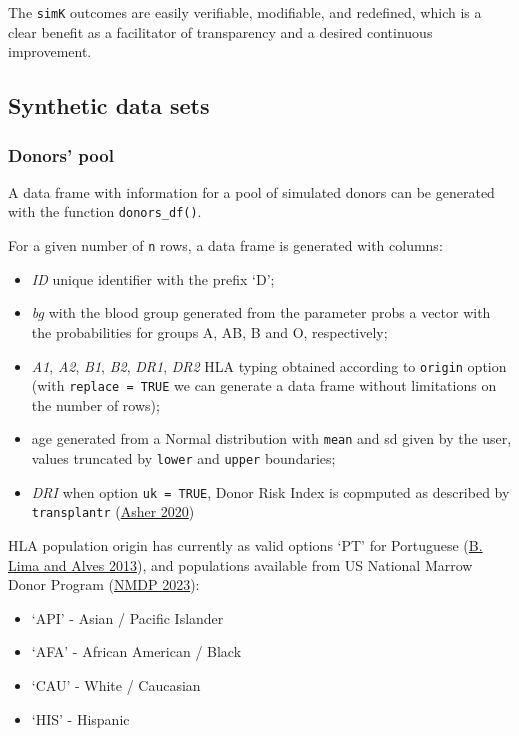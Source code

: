 \documentclass[
]{article}
\providecommand{\tightlist}{%
  \setlength{\itemsep}{0pt}\setlength{\parskip}{0pt}}
\begin{document}
The \texttt{simK} outcomes are easily verifiable, modifiable, and
redefined, which is a clear benefit as a facilitator of transparency and
a desired continuous improvement.

\hypertarget{synthetic-data-sets}{%
\subsection{Synthetic data sets}\label{synthetic-data-sets}}

\hypertarget{donors-pool}{%
\subsubsection{Donors' pool}\label{donors-pool}}

A data frame with information for a pool of simulated donors can be
generated with the function \texttt{donors\_df()}.

For a given number of \texttt{n} rows, a data frame is generated with
columns:

\begin{itemize}
\tightlist
\item
  \emph{ID} unique identifier with the prefix `D';
\item
  \emph{bg} with the blood group generated from the parameter probs a
  vector with the probabilities for groups A, AB, B and O, respectively;
\item
  \emph{A1}, \emph{A2}, \emph{B1}, \emph{B2}, \emph{DR1}, \emph{DR2} HLA
  typing obtained according to \texttt{origin} option (with
  \texttt{replace\ =\ TRUE} we can generate a data frame without
  limitations on the number of rows);
\item
  age generated from a Normal distribution with \texttt{mean} and sd
  given by the user, values truncated by \texttt{lower} and
  \texttt{upper} boundaries;
\item
  \emph{DRI} when option \texttt{uk\ =\ TRUE}, Donor Risk Index is
  copmputed as described by \texttt{transplantr}
  (\protect\hyperlink{ref-transplantr}{Asher 2020})
\end{itemize}

HLA population origin has currently as valid options `PT' for Portuguese
(\protect\hyperlink{ref-Lima:2013a}{B. Lima and Alves 2013}), and
populations available from US National Marrow Donor Program
(\protect\hyperlink{ref-nmdp:2023}{NMDP 2023}):

\begin{itemize}
\tightlist
\item
  `API' - Asian / Pacific Islander
\item
  `AFA' - African American / Black
\item
  `CAU' - White / Caucasian
\item
  `HIS' - Hispanic
\end{itemize}
\end{document}
